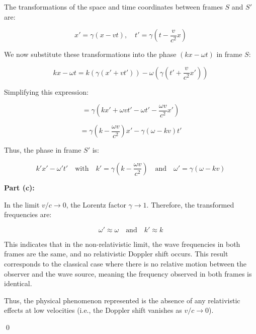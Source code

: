 \documentclass{article}
\begin{document}
The transformations of the space and time coordinates between frames \( S \) and \( S' \) are:

\[
x' = \gamma (x - vt), \quad t' = \gamma \left( t - \frac{v}{c^2} x \right)
\]

We now substitute these transformations into the phase \( (k x - \omega t) \) in frame \( S \):

\[
k x - \omega t = k \left( \gamma (x' + v t') \right) - \omega \left( \gamma \left( t' + \frac{v}{c^2} x' \right) \right)
\]

Simplifying this expression:

\[
= \gamma \left( k x' + \omega v t' - \omega t' - \frac{\omega v}{c^2} x' \right)
\]

\[
= \gamma \left( k - \frac{\omega v}{c^2} \right) x' - \gamma (\omega - kv) t'
\]

Thus, the phase in frame \( S' \) is:

\[
k' x' - \omega' t' \quad \text{with} \quad k' = \gamma \left( k - \frac{\omega v}{c^2} \right) \quad \text{and} \quad \omega' = \gamma (\omega - k v)
\]

\textbf{Part (c):}

In the limit \( v/c \to 0 \), the Lorentz factor \( \gamma \to 1 \). Therefore, the transformed frequencies are:

\[
\omega' \approx \omega \quad \text{and} \quad k' \approx k
\]

This indicates that in the non-relativistic limit, the wave frequencies in both frames are the same, and no relativistic Doppler shift occurs. This result corresponds to the classical case where there is no relative motion between the observer and the wave source, meaning the frequency observed in both frames is identical.

Thus, the physical phenomenon represented is the absence of any relativistic effects at low velocities (i.e., the Doppler shift vanishes as \( v/c \to 0 \)).

\qed
\end{document}
